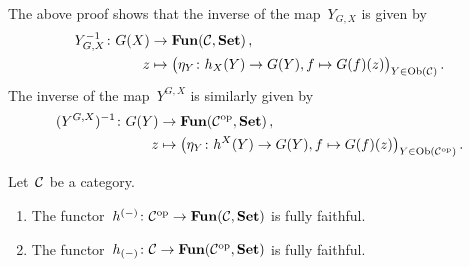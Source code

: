 \begin{remark}
  The above proof shows that the inverse of the map~$Y_{G,X}$ is given by
  \begin{align*}
              Y_{G,X}^{-1}
     \colon   G(X)
    &\to      \mathbf{Fun}(\mathcal{C}, \mathbf{Set}) \,,
    \\
              z
    &\mapsto  \bigl( \eta_Y \colon h_X(Y) \to G(Y), f \mapsto G(f)(z) \bigr)_{Y \in \operatorname{Ob}(\mathcal{C})} \,.
  \end{align*}
  The inverse of the map~$Y^{G,X}$ is similarly given by
  \begin{align*}
              (Y^{G,X})^{-1}
     \colon   G(Y)
    &\to      \mathbf{Fun}(\mathcal{C}^{\mathrm{op}}, \mathbf{Set}) \,,
    \\
              z
    &\mapsto  \bigl( \eta_Y \colon h^X(Y) \to G(Y), f \mapsto G(f)(z) \bigr)_{Y \in \operatorname{Ob}(\mathcal{C}^{\mathrm{op}})} \,.
  \end{align*}
\end{remark}







\begin{theorem}
  Let~$\mathcal{C}$ be a category.
  \begin{enumerate}
    \item
      The functor~$h^{(-)} \colon \mathcal{C}^{\mathrm{op}} \to \mathbf{Fun}(\mathcal{C}, \mathbf{Set})$ is fully faithful.
    \item
      \label{contravariant yoneda embedding}
      The functor~$h_{(-)} \colon \mathcal{C} \to \mathbf{Fun}(\mathcal{C}^{\mathrm{op}}, \mathbf{Set})$ is fully faithful.
  \end{enumerate}
\end{theorem}


